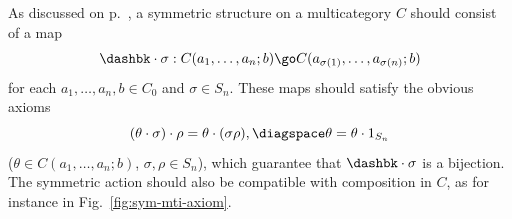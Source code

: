 As discussed on p.~\pageref{p:sym-mti-informal}, a symmetric structure on a
multicategory $C$ should consist of a map
%
\begin{equation}	\label{eq:sym-action}
\dashbk\cdot\sigma:
C(a_1, \ldots, a_n; b)
\go
C(a_{\sigma(1)}, \ldots, a_{\sigma(n)}; b)
\end{equation}
%
for each $a_1, \ldots, a_n, b \in C_0$ and $\sigma\in S_n$.  These maps
should satisfy the obvious axioms
%
\begin{equation}	\label{eq:sym-axioms-obvious}
(\theta \cdot \sigma) \cdot \rho = \theta \cdot (\sigma\rho),
\diagspace
\theta = \theta \cdot 1_{S_n}
\end{equation}
%
($\theta\in C(a_1, \ldots, a_n; b)$, $\sigma, \rho \in S_n$), which
guarantee that $\dashbk\cdot\sigma$ is a bijection.  The symmetric action
should also be compatible with composition in $C$, as for instance in
Fig.~\ref{fig:sym-mti-axiom}.
%
